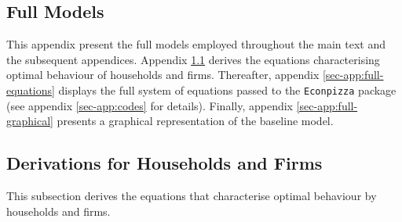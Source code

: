 \documentclass[a4paper,12pt]{article} %
\numberwithin{equation}{section} %
\numberwithin{figure}{section}
\numberwithin{table}{section}
\begin{document}
\newpage
\thispagestyle{plain}
\printbibliography[heading=bibintoc] %

\newpage
\begin{refsection}
\thispagestyle{plain}
\renewcommand*{\thepage}{A-\arabic{page}} %
\begin{appendices}
\section{Full Models}
\label{sec-app:full}

This appendix present the full models employed throughout the main text and the subsequent appendices. Appendix \ref{sec-app:full-derivations} derives the equations characterising optimal behaviour of households and firms. Thereafter, appendix \ref{sec-app:full-equations} displays the full system of equations passed to the \texttt{Econpizza} package (see appendix \ref{sec-app:codes} for details). Finally, appendix \ref{sec-app:full-graphical} presents a graphical representation of the baseline model.

\subsection{Derivations for Households and Firms}
\label{sec-app:full-derivations}

This subsection derives the equations that characterise optimal behaviour by households and firms.


\end{appendices}
\end{refsection}
\end{document}
